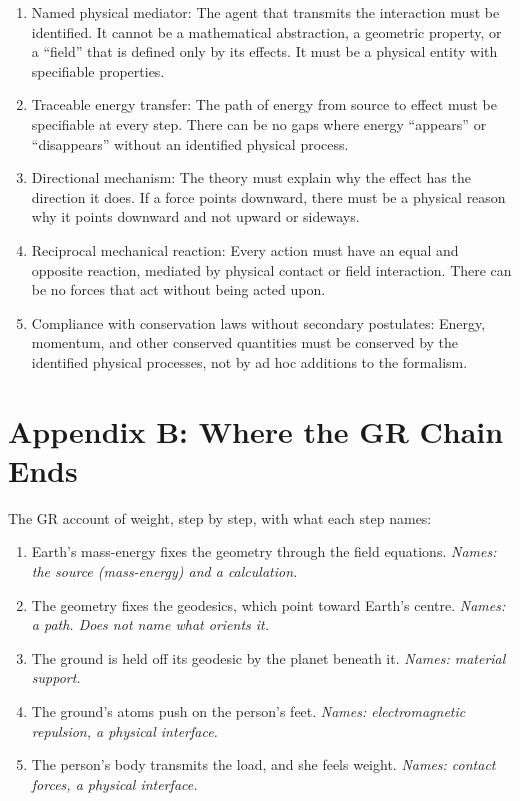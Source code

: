 \documentclass[11pt]{article}
\providecommand{\tightlist}{\setlength{\itemsep}{0pt}\setlength{\parskip}{0pt}}
\begin{document}
\begin{enumerate}
\def\labelenumi{\arabic{enumi}.}
\item
  Named physical mediator: The agent that transmits the interaction must be identified. It cannot be a mathematical abstraction, a geometric property, or a ``field'' that is defined only by its effects. It must be a physical entity with specifiable properties.
\item
  Traceable energy transfer: The path of energy from source to effect must be specifiable at every step. There can be no gaps where energy ``appears'' or ``disappears'' without an identified physical process.
\item
  Directional mechanism: The theory must explain why the effect has the direction it does. If a force points downward, there must be a physical reason why it points downward and not upward or sideways.
\item
  Reciprocal mechanical reaction: Every action must have an equal and opposite reaction, mediated by physical contact or field interaction. There can be no forces that act without being acted upon.
\item
  Compliance with conservation laws without secondary postulates: Energy, momentum, and other conserved quantities must be conserved by the identified physical processes, not by ad hoc additions to the formalism.
\end{enumerate}

\section{Appendix B: Where the GR Chain Ends}

The GR account of weight, step by step, with what each step names:

\begin{enumerate}
\def\labelenumi{\arabic{enumi}.}
\tightlist
\item
  Earth's mass-energy fixes the geometry through the field equations. \emph{Names: the source (mass-energy) and a calculation.}
\item
  The geometry fixes the geodesics, which point toward Earth's centre. \emph{Names: a path. Does not name what orients it.}
\item
  The ground is held off its geodesic by the planet beneath it. \emph{Names: material support.}
\item
  The ground's atoms push on the person's feet. \emph{Names: electromagnetic repulsion, a physical interface.}
\item
  The person's body transmits the load, and she feels weight. \emph{Names: contact forces, a physical interface.}
\end{enumerate}
\end{document}
